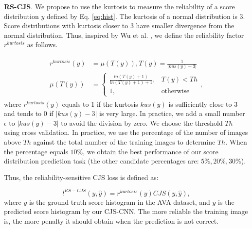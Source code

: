 \documentclass[letterpaper]{article} %
\begin{document}
\textbf{RS-CJS}. We propose to use the kurtosis to measure the reliability of a score distribution $y$ defined by Eq. \ref{eq:hist}. The kurtosis of a normal distribution is 3. Score distributions with kurtosis closer to 3 have smaller divergence from the normal distribution. Thus, inspired by Wu et al. \cite{WuICCV2011}, we define the reliability factor $r^{kurtosis}$ as follows.


\begin{eqnarray}
\begin{split}
r^{kurtosis}(y) & = \mu(T(y)), T(y) = \frac{1}{|kus(y)-3|}\\
\mu(T(y)) & = 
\begin{cases}
  \frac{ln(T(y)+1)}{ln(T(y)+1)+1}, & T(y)<Th  \\ 
  1,  & \text{otherwise}  
\end{cases},
\label{eq:r_kus}
\end{split}
\end{eqnarray}
where $r^{kurtosis}(y)$ equals to 1 if the kurtosis $kus(y)$ is sufficiently close to 3 and tends to 0 if $|kus(y)-3|$ is very large. In practice, we add a small number $\epsilon$ to $|kus(y)-3|$ to avoid the division by zero. We choose the threshold $Th$ using cross validation. 
In practice, we use the percentage of the number of images above $Th$ against the total number of the training images to determine $Th$. When the percentage equals $10\%$, we obtain the best performance of our score distribution prediction task (the other candidate percentages are: $5\%, 20\%, 30\%$).




%

Thus, the reliability-sensitive CJS loss is defined as:

\begin{equation}
l^{RS-CJS}(y,\hat{y}) = r^{kurtosis}(y) CJS(y,\hat{y}),
\label{eq:RS-CJS}
\end{equation}
where $y$ is the ground truth score histogram in the AVA dataset, and $\hat{y}$ is the predicted score histogram by our CJS-CNN. The more reliable the training image is, the more penalty it should obtain when the prediction is not correct.
\end{document}
